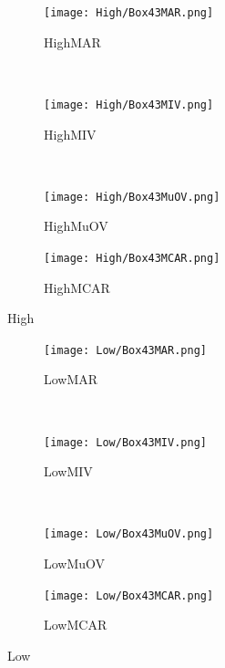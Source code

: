 \documentclass{article}
\begin{document}
		\clearpage
	


		
		\begin{figure}
			\centering
			\begin{subfigure}[b]{0.45\textwidth}
				\texttt{[image: High/Box43MAR.png]}
				\caption{HighMAR}
				\label{fig:HighMAR}
			\end{subfigure}
			~ %
			\begin{subfigure}[b]{0.45\textwidth}
				\texttt{[image: High/Box43MIV.png]}
				\caption{HighMIV}
				\label{fig:HighMIV}
			\end{subfigure}
			\newline
			~ %
			\begin{subfigure}[b]{0.45\textwidth}
				\texttt{[image: High/Box43MuOV.png]}
				\caption{HighMuOV}
				\label{fig:HighMuOV}
			\end{subfigure}
			\begin{subfigure}[b]{0.45\textwidth}
				\texttt{[image: High/Box43MCAR.png]}
				\caption{HighMCAR}
				\label{fig:HighMCAR}
			\end{subfigure}
			\caption{High}\label{fig:High}
		\end{figure}
		
		\begin{figure}
			\centering
			\begin{subfigure}[b]{0.45\textwidth}
				\texttt{[image: Low/Box43MAR.png]}
				\caption{LowMAR}
				\label{fig:LowMAR}
			\end{subfigure}
			~ %
			\begin{subfigure}[b]{0.45\textwidth}
				\texttt{[image: Low/Box43MIV.png]}
				\caption{LowMIV}
				\label{fig:LowMIV}
			\end{subfigure}
			\newline
			~ %
			\begin{subfigure}[b]{0.45\textwidth}
				\texttt{[image: Low/Box43MuOV.png]}
				\caption{LowMuOV}
				\label{fig:LowMuOV}
			\end{subfigure}
			\begin{subfigure}[b]{0.45\textwidth}
				\texttt{[image: Low/Box43MCAR.png]}
				\caption{LowMCAR}
				\label{fig:LowMCAR}
			\end{subfigure}
			\caption{Low}\label{fig:Low}
		\end{figure}
		
\end{document}
